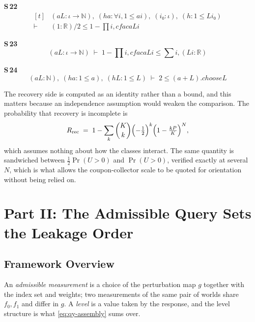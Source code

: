 \noindent\textbf{S\,22}\quad{}
{\footnotesize\[ \begin{aligned}[t]
&(\mathit{a} \mathit{L} : \iota \to \mathbb{N} ),\; (\mathit{ha} : \forall \mathit{i}, 1 \leq \mathit{a} \mathit{i}),\; (\mathit{i₀} : \iota ),\; (\mathit{h} : 1 \leq \mathit{L} \mathit{i₀})\\
\vdash\;&(1:\mathbb{R} ) / 2 \leq 1 - \textstyle\prod \mathit{i}, \mathit{cfac} \mathit{a} \mathit{L} \mathit{i}
\end{aligned} \]}

\noindent\textbf{S\,23}\quad{}
{\footnotesize\[ (\mathit{a} \mathit{L} : \iota \to \mathbb{N} ) \;\vdash\; 1 - \textstyle\prod \mathit{i}, \mathit{cfac} \mathit{a} \mathit{L} \mathit{i} \leq \textstyle\sum \mathit{i}, (\mathit{L} \mathit{i} : \mathbb{R} ) \]}

\noindent\textbf{S\,24}\quad{}
{\footnotesize\[ (\mathit{a} \mathit{L} : \mathbb{N} ),\; (\mathit{ha} : 1 \leq \mathit{a}),\; (\mathit{hL} : 1 \leq \mathit{L}) \;\vdash\; 2 \leq (\mathit{a} + \mathit{L}).\mathit{choose} \mathit{L} \]}


The recovery side is computed as an identity rather than a bound, and this matters because an
independence assumption would weaken the comparison. The probability that recovery is
incomplete is
\begin{equation}
R_{\mathrm{rec}}
\;=\;1-\sum_{k}\binom{K}{k}\Bigl(-\tfrac12\Bigr)^{k}
     \Bigl(1-\tfrac{kP}{K}\Bigr)^{N},
\label{eq:sp-recover}
\end{equation}
which assumes nothing about how the classes interact. The same quantity is sandwiched between
$\tfrac12\Pr(U>0)$ and $\Pr(U>0)$, verified exactly at several $N$, which is what allows the
coupon-collector scale to be quoted for orientation without being relied on.


\section{Part II: The Admissible Query Sets the Leakage Order}

\label{sec:qy-setting}

\subsection{Framework Overview}

An \emph{admissible measurement} is a choice of the perturbation map $g$ together with the
index set and weights; two measurements of the same pair of worlds share $f_{0},f_{1}$ and
differ in $g$. A \emph{level} is a value taken by the response, and the level structure is
what \eqref{eq:qy-assembly} sums over.

